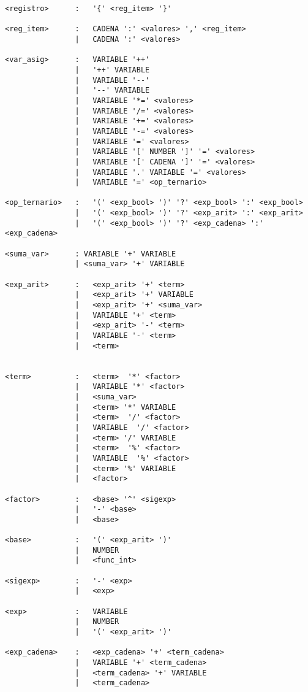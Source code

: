 \begin{verbatim}
<registro>      :   '{' <reg_item> '}'

<reg_item>      :   CADENA ':' <valores> ',' <reg_item>
                |   CADENA ':' <valores> 

<var_asig>      :   VARIABLE '++'
                |   '++' VARIABLE
                |   VARIABLE '--'
                |   '--' VARIABLE
                |   VARIABLE '*=' <valores>
                |   VARIABLE '/=' <valores>
                |   VARIABLE '+=' <valores>
                |   VARIABLE '-=' <valores>
                |   VARIABLE '=' <valores>
                |   VARIABLE '[' NUMBER ']' '=' <valores>
                |   VARIABLE '[' CADENA ']' '=' <valores>
                |   VARIABLE '.' VARIABLE '=' <valores>
                |   VARIABLE '=' <op_ternario>

<op_ternario>   :   '(' <exp_bool> ')' '?' <exp_bool> ':' <exp_bool>
                |   '(' <exp_bool> ')' '?' <exp_arit> ':' <exp_arit>
                |   '(' <exp_bool> ')' '?' <exp_cadena> ':' <exp_cadena>

<suma_var>      : VARIABLE '+' VARIABLE
                | <suma_var> '+' VARIABLE

<exp_arit>      :   <exp_arit> '+' <term>
                |   <exp_arit> '+' VARIABLE
                |   <exp_arit> '+' <suma_var>
                |   VARIABLE '+' <term>
                |   <exp_arit> '-' <term>
                |   VARIABLE '-' <term>
                |   <term>


<term>          :   <term>  '*' <factor>
                |   VARIABLE '*' <factor>
                |   <suma_var>
                |   <term> '*' VARIABLE
                |   <term>  '/' <factor>
                |   VARIABLE  '/' <factor>
                |   <term> '/' VARIABLE
                |   <term>  '%' <factor>
                |   VARIABLE  '%' <factor>
                |   <term> '%' VARIABLE
                |   <factor>

<factor>        :   <base> '^' <sigexp>
                |   '-' <base> 
                |   <base>

<base>          :   '(' <exp_arit> ')'
                |   NUMBER
                |   <func_int>

<sigexp>        :   '-' <exp>
                |   <exp>

<exp>           :   VARIABLE
                |   NUMBER
                |   '(' <exp_arit> ')'

<exp_cadena>    :   <exp_cadena> '+' <term_cadena>
                |   VARIABLE '+' <term_cadena>
                |   <term_cadena> '+' VARIABLE
                |   <term_cadena> 


\end{verbatim}
